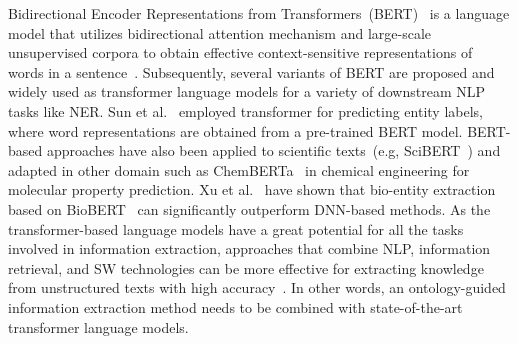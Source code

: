 \hspace*{3.5mm} Bidirectional Encoder Representations from Transformers~(BERT)~\cite{devlin2018bert} is a language model that utilizes bidirectional attention mechanism and large-scale unsupervised corpora to obtain effective context-sensitive representations of words in a sentence~\cite{xue2019fine}. Subsequently, several variants of BERT are proposed and widely used as transformer language models for a variety of downstream NLP tasks like NER. Sun et al.~\cite{sun2020biomedical} employed transformer for predicting entity labels, where word representations are obtained from a pre-trained BERT model. BERT-based approaches have also been applied to scientific texts~(e.g, SciBERT~\cite{Beltagy2019SciBERT}) and adapted in other domain such as ChemBERTa~\cite{chithrananda2020chemberta} in chemical engineering for molecular property prediction.
Xu et al.~\cite{xu2020building} have shown that bio-entity extraction based on BioBERT~\cite{lee2020biobert} can significantly outperform DNN-based methods. As the transformer-based language models have a great potential for all the tasks involved in information extraction, approaches that combine NLP, information retrieval, and SW technologies can be more effective for extracting knowledge from unstructured texts with high accuracy~\cite{anantharangachar2013ontology}. %
In other words, an ontology-guided information extraction method needs to be combined with state-of-the-art transformer language models. %

